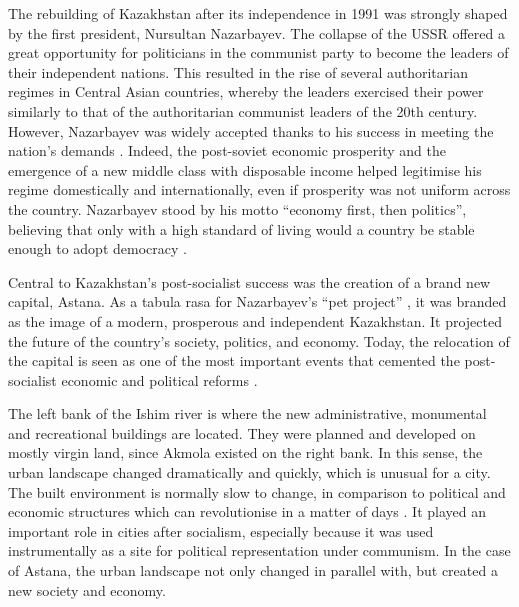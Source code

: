 \documentclass{article}
\begin{document}
The rebuilding of Kazakhstan after its independence in 1991 was strongly shaped by the first president, Nursultan Nazarbayev. The collapse of the USSR offered a great opportunity for politicians in the communist party to become the leaders of their independent nations. This resulted in the rise of several authoritarian regimes in Central Asian countries, whereby the leaders exercised their power similarly to that of the authoritarian communist leaders of the 20th century. However, Nazarbayev was widely accepted thanks to his success in meeting the nation's demands \parencite{isaacs2010papa}. Indeed, the post-soviet economic prosperity and the emergence of a new middle class with disposable income helped legitimise his regime  domestically and internationally, even if prosperity was not uniform across the country. Nazarbayev stood by his motto ``economy first, then politics'', believing that only with a high standard of living would a country be stable enough to adopt democracy \parencite{kassymbekov_2020}.

Central to Kazakhstan's post-socialist success was the creation of a brand new capital, Astana. As a tabula rasa for Nazarbayev's ``pet project'' \parencite{?}, it was branded as the image of a modern, prosperous and independent Kazakhstan. It projected the future of the country's society, politics, and economy. Today, the relocation of the capital is seen as one of the most important events that cemented the post-socialist economic and political reforms \parencite{kassymbekov_2020}.

The left bank of the Ishim river is where the new administrative, monumental and recreational buildings are located. They were planned and developed on mostly virgin land, since Akmola existed on the right bank. In this sense, the urban landscape changed dramatically and quickly, which is unusual for a city. The built environment is normally slow to change, in comparison to political and economic structures which can revolutionise in a matter of days \parencite{stanilov2007post}. It played an important role in cities after socialism, especially because it was used instrumentally as a site for political representation under communism. In the case of Astana, the urban landscape not only changed in parallel with, but created a new society and economy. 
\end{document}

